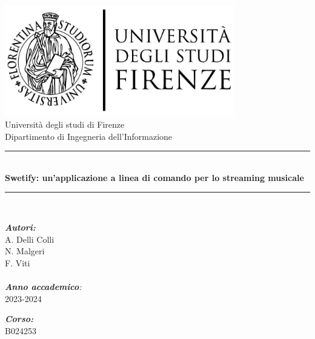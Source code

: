 \documentclass{article}
\begin{document}
  \begin{titlepage}
    \begin{center}
      \vspace*{1cm}
      \includegraphics[width=10cm]{unifi.jpg} \\
      \vspace{1cm}
      \LARGE Università degli studi di Firenze \\
      \vspace{0.4cm}
      \LARGE Dipartimento di Ingegneria dell'Informazione \\
      \rule{17cm}{1.5pt} \\
      \vspace{0.4cm}
      \LARGE \textbf{Swetify: un'applicazione a linea di comando per lo streaming musicale} \\
      \rule{17cm}{1.5pt} \\
      \vspace{1cm}
      \begin{adjustwidth}{1cm}{}
        \begin{flushleft}
          \begin{minipage}[t]{0.45\textwidth}
            \large \textit{\textbf{Autori:}} \\
            A. Delli Colli \\
            N. Malgeri \\
            F. Viti \\
            \hspace{-4cm} \\
            \large \textit{\textbf{Anno accademico}:} \\
            2023-2024
          \end{minipage}
          \begin{minipage}[t]{0.45\textwidth}
            \hspace*{1cm}
            \large \textit{\textbf{Corso:}} \\
            \hspace*{1.1cm} B024253 \\

\end{minipage}
\end{flushleft}
\end{adjustwidth}
\end{center}
\end{titlepage}
\end{document}
